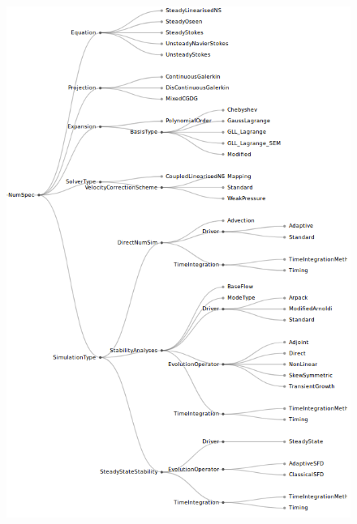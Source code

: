 \documentclass[11pt, a4paper]{report}
\begin{document}
\begin{figure}[htb!]
 \centering
 \includegraphics[width=1\linewidth,  clip=true, trim = .1cm 0cm 0cm 0cm]{numericalSpecification}
 \label{fig:numericalSpecification}
\end{figure}
\end{document}
